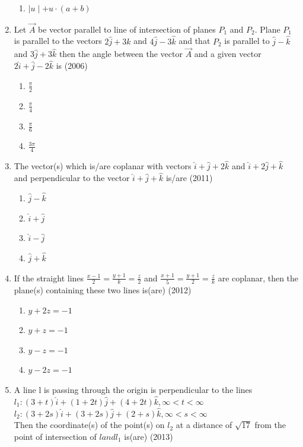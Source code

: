 \documentclass[12pt]{article}
\providecommand{\brak}[1]{\ensuremath{\left(#1\right)}}
\begin{document}
\begin{enumerate}
\begin{enumerate}
\item $\mid u \mid +  u \cdot \brak{a+b}$
\end{enumerate}
\item  Let $\vec{A}$ be vector parallel to line of intersection of planes $P_1$ and $P_2$. Plane $P_1$ is parallel to the vectors $2\hat{j}+3\hat{k}$ and $4\hat{j}-3\hat{k}$ and that $P_2$ is parallel to $\hat{j}-\hat{k}$ and $3\hat{j}+3\hat{k}$ then the angle between the vector $\vec{A}$ and a given vector $2\hat{i}+\hat{j}-2\hat{k}$ is (2006)
\begin{enumerate}
\item $\frac{\pi}{2}$
\item $\frac{\pi}{4}$
\item $\frac{\pi}{6}$
\item $\frac{3\pi}{4}$
\end{enumerate}
\item The vector(s) which is/are coplanar with vectors $\hat{i}+\hat{j}+2\hat{k}$ and $\hat{i}+2\hat{j}+\hat{k}$ and perpendicular to the vector $\hat{i}+\hat{j}+\hat{k}$ is/are   (2011)
\begin{enumerate}
\item $\hat{j}-\hat{k}$
\item $\hat{i}+\hat{j}$
\item $\hat{i}-\hat{j}$
\item $\hat{j}+\hat{k}$
\end{enumerate}
\item If the straight lines $\frac{x-1}{2}=\frac{y+1}{k}=\frac{z}{2}$ and $\frac{x+1}{5}=\frac{y+1}{2}=\frac{z}{k}$ are coplanar, then the plane(s) containing these two lines is(are)  (2012)
\begin{enumerate}
\item $y+2z=-1$
\item $y+z=-1$
\item $y-z=-1$
\item $y-2z=-1$
\end{enumerate}
\item A line l is passing through the origin is perpendicular to the lines $l_1:\brak{3+t}\hat{i}+\brak{1+2t}\hat{j}+\brak{4+2t}\hat{k},   \infty< t <\infty$\\
$l_2:\brak{3+2s}\hat{i}+\brak{3+2s}\hat{j}+\brak{2+s}\hat{k},   \infty< s <\infty$\\
Then the coordinate(s) of the point(s) on $l_2$ at a distance of $\sqrt{17}$ from the point of intersection of $l and l_1$ is(are)  (2013)
\begin{enumerate}

\end{enumerate}
\end{enumerate}
\end{document}
